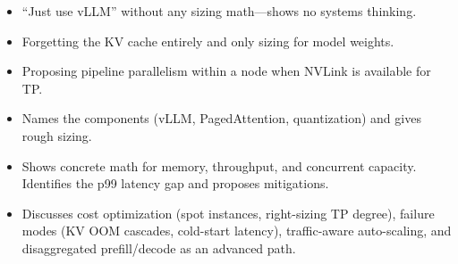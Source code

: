 \begin{interviewq}
\redflags
\begin{itemize}
    \item ``Just use vLLM'' without any sizing math---shows no systems thinking.
    \item Forgetting the KV cache entirely and only sizing for model weights.
    \item Proposing pipeline parallelism within a node when NVLink is available for TP.
\end{itemize}


\goodgreat
\begin{itemize}
    \item {} Names the components (vLLM, PagedAttention, quantization) and gives rough sizing.
    \item {} Shows concrete math for memory, throughput, and concurrent capacity. Identifies the p99 latency gap and proposes mitigations.
    \item {} Discusses cost optimization (spot instances, right-sizing TP degree), failure modes (KV OOM cascades, cold-start latency), traffic-aware auto-scaling, and disaggregated prefill/decode as an advanced path.
\end{itemize}

\end{interviewq}


